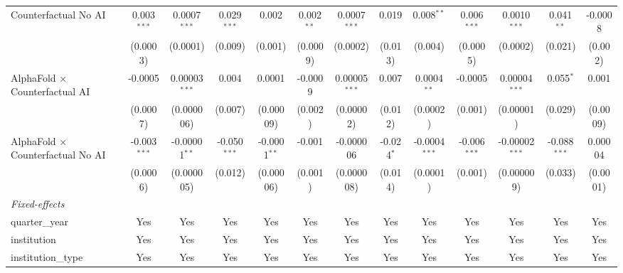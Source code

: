 \begin{tabular}{lcccccccccccc}
   Counterfactual No AI                     & 0.003$^{***}$  & 0.0007$^{***}$  & 0.029$^{***}$  & 0.002          & 0.002$^{**}$   & 0.0007$^{***}$  & 0.019        & 0.008$^{**}$    & 0.006$^{***}$  & 0.0010$^{***}$   & 0.041$^{**}$   & -0.0008\\   
                                            & (0.0003)       & (0.0001)        & (0.009)        & (0.001)        & (0.0009)       & (0.0002)        & (0.013)      & (0.004)         & (0.0005)       & (0.0002)         & (0.021)        & (0.002)\\   
   AlphaFold $\times$ Counterfactual AI     & -0.0005        & 0.00003$^{***}$ & 0.004          & 0.0001         & -0.0009        & 0.00005$^{***}$ & 0.007        & 0.0004$^{**}$   & -0.0005        & 0.00004$^{***}$  & 0.055$^{*}$    & 0.001\\   
                                            & (0.0007)       & (0.000006)      & (0.007)        & (0.00009)      & (0.002)        & (0.00002)       & (0.012)      & (0.0002)        & (0.001)        & (0.00001)        & (0.029)        & (0.0009)\\   
   AlphaFold $\times$ Counterfactual No AI  & -0.003$^{***}$ & -0.00001$^{**}$ & -0.050$^{***}$ & -0.0001$^{**}$ & -0.001         & -0.000006       & -0.024$^{*}$ & -0.0004$^{***}$ & -0.006$^{***}$ & -0.00002$^{***}$ & -0.088$^{***}$ & 0.00004\\   
                                            & (0.0006)       & (0.000005)      & (0.012)        & (0.00006)      & (0.001)        & (0.000008)      & (0.014)      & (0.0001)        & (0.001)        & (0.000009)       & (0.033)        & (0.0001)\\   
   \midrule
   \emph{Fixed-effects}\\
   quarter\_year                            & Yes            & Yes             & Yes            & Yes            & Yes            & Yes             & Yes          & Yes             & Yes            & Yes              & Yes            & Yes\\  
   institution                              & Yes            & Yes             & Yes            & Yes            & Yes            & Yes             & Yes          & Yes             & Yes            & Yes              & Yes            & Yes\\  
   institution\_type                        & Yes            & Yes             & Yes            & Yes            & Yes            & Yes             & Yes          & Yes             & Yes            & Yes              & Yes            & Yes\\  

\end{tabular}
